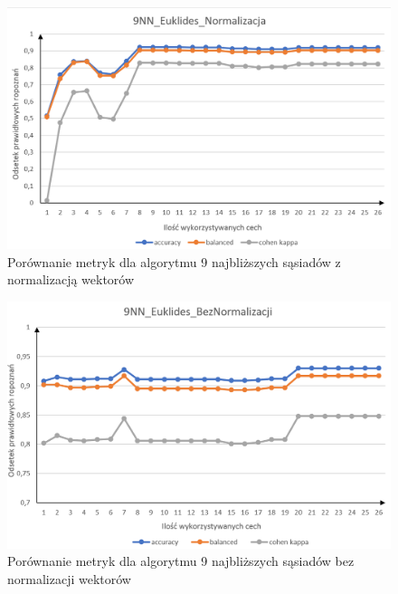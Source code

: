\documentclass[12pt]{article}
\begin{document}
\begin{figure}[H]
	\centering
		\includegraphics[scale=0.66]{images/metrics/9nn_euklides_norm.png}
	\caption{Porównanie metryk dla algorytmu 9 najbliższych sąsiadów z normalizacją wektorów}
\end{figure}
\begin{figure}[H]
	\centering
		\includegraphics[scale=0.66]{images/metrics/9nn_euklides_beznorm.png}
	\caption{Porównanie metryk dla algorytmu 9 najbliższych sąsiadów bez normalizacji wektorów}
\end{figure}
\end{document}
